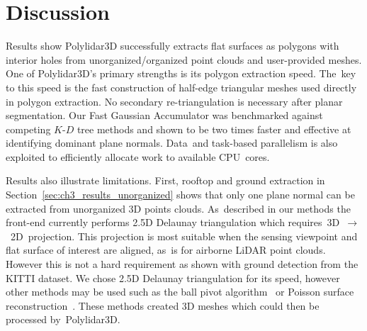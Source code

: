 \section{Discussion}\label{sec:ch3_discussion}



Results show Polylidar3D successfully extracts flat surfaces as polygons with interior holes from unorganized/organized point clouds and user-provided meshes. One of Polylidar3D's primary strengths is its polygon extraction speed.  The~key to this speed is the fast construction of half-edge triangular meshes used directly in polygon extraction. No secondary re-triangulation is necessary after planar segmentation. Our Fast Gaussian Accumulator was benchmarked against competing $K$-$D$ tree methods and shown to be two times faster and effective at identifying dominant plane normals. Data~and task-based parallelism is also exploited to efficiently allocate work to available CPU~cores.



Results also illustrate limitations. First, rooftop and ground extraction in Section~\ref{sec:ch3_results_unorganized} shows that only one plane normal can be extracted from unorganized 3D points clouds. As~described in our methods the front-end currently performs 2.5D Delaunay triangulation which requires~3D~$\rightarrow$~2D~projection. This projection is most suitable when the sensing viewpoint and flat surface of interest are aligned, as~is for airborne LiDAR point clouds. However this is not a hard requirement as shown with ground detection from the KITTI dataset. We chose 2.5D Delaunay triangulation for its speed, however other methods may be used such as the ball pivot algorithm~\cite{bernardini_ball-pivoting_1999} or Poisson surface reconstruction~\cite{kazhdan_screened_2013}. These methods created 3D meshes which could then be processed by~Polylidar3D.

